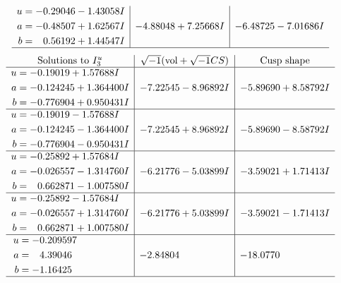 \documentclass[1p]{elsarticle_modified}
\theoremstyle{definition}
\newcommand{\I}{\sqrt{-1}}
\begin{document}
$$\begin{array}{c|c|c}
\begin{aligned}
u &= -0.29046 - 1.43058 I \\
a &= -0.48507 + 1.62567 I \\
b &= \phantom{-}0.56192 + 1.44547 I\end{aligned}
 & -4.88048 + 7.25668 I & -6.48725 - 7.01686 I\\
 \hline 
 \end{array}$$\newpage$$\begin{array}{c|c|c}  
\text{Solutions to }I^u_{3}& \I (\text{vol} + \sqrt{-1}CS) & \text{Cusp shape}\\
 \hline 
\begin{aligned}
u &= -0.19019 + 1.57688 I \\
a &= -0.124245 + 1.364400 I \\
b &= -0.776904 + 0.950431 I\end{aligned}
 & -7.22545 - 8.96892 I & -5.89690 + 8.58792 I \\ \hline\begin{aligned}
u &= -0.19019 - 1.57688 I \\
a &= -0.124245 - 1.364400 I \\
b &= -0.776904 - 0.950431 I\end{aligned}
 & -7.22545 + 8.96892 I & -5.89690 - 8.58792 I \\ \hline\begin{aligned}
u &= -0.25892 + 1.57684 I \\
a &= -0.026557 - 1.314760 I \\
b &= \phantom{-}0.662871 - 1.007580 I\end{aligned}
 & -6.21776 - 5.03899 I & -3.59021 + 1.71413 I \\ \hline\begin{aligned}
u &= -0.25892 - 1.57684 I \\
a &= -0.026557 + 1.314760 I \\
b &= \phantom{-}0.662871 + 1.007580 I\end{aligned}
 & -6.21776 + 5.03899 I & -3.59021 - 1.71413 I \\ \hline\begin{aligned}
u &= -0.209597\phantom{ +0.000000I} \\
a &= \phantom{-}4.39046\phantom{ +0.000000I} \\
b &= -1.16425\phantom{ +0.000000I}\end{aligned}
 & -2.84804\phantom{ +0.000000I} & -18.0770\phantom{ +0.000000I}\\
 \hline 
 \end{array}$$\newpage\newpage\renewcommand{\arraystretch}{1}
\end{document}
